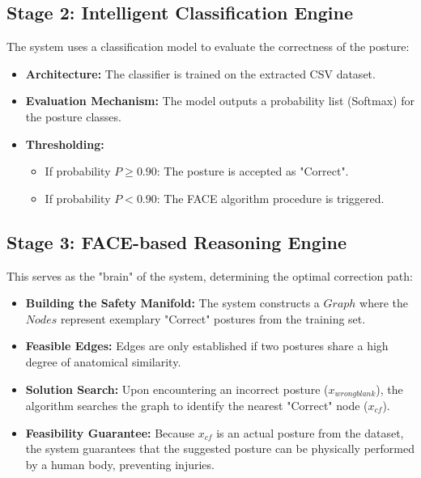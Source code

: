 \documentclass[pdflatex,sn-mathphys-num]{sn-jnl}%
\theoremstyle{thmstyleone}%
\theoremstyle{thmstyletwo}%
\theoremstyle{thmstylethree}%
\begin{document}
\subsection{Stage 2: Intelligent Classification Engine}
The system uses a classification model to evaluate the correctness of the posture:
\begin{itemize}
    \item \textbf{Architecture:} The classifier is trained on the extracted CSV dataset.
    \item \textbf{Evaluation Mechanism:} The model outputs a probability list (Softmax) for the posture classes.
    \item \textbf{Thresholding:}
    \begin{itemize}
        \item If probability $P \geq 0.90$: The posture is accepted as "Correct".
        \item If probability $P < 0.90$: The FACE algorithm procedure is triggered.
    \end{itemize}
\end{itemize}

\subsection{Stage 3: FACE-based Reasoning Engine}
This serves as the "brain" of the system, determining the optimal correction path:
\begin{itemize}
    \item \textbf{Building the Safety Manifold:} The system constructs a $Graph$ where the $Nodes$ represent exemplary "Correct" postures from the training set.
    \item \textbf{Feasible Edges:} Edges are only established if two postures share a high degree of anatomical similarity.
    \item \textbf{Solution Search:} Upon encountering an incorrect posture ($x_{wrongblank}$), the algorithm searches the graph to identify the nearest "Correct" node ($x_{cf}$).
    \item \textbf{Feasibility Guarantee:} Because $x_{cf}$ is an actual posture from the dataset, the system guarantees that the suggested posture can be physically performed by a human body, preventing injuries.
\end{itemize}
\end{document}
